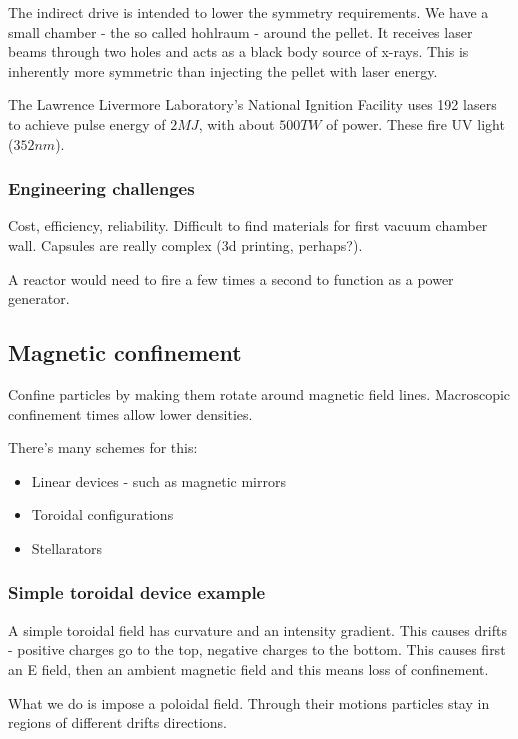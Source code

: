 \documentclass[PlasmaNotes.tex]{subfiles}
\begin{document}
The indirect drive is intended to lower the symmetry requirements. We have a small chamber - the so called hohlraum - around the pellet. It receives laser beams through two holes and acts as a black body source of x-rays. This is inherently more symmetric than injecting the pellet with laser energy.

The Lawrence Livermore Laboratory's National Ignition Facility uses 192 lasers to achieve pulse energy of $2 MJ$, with about $500 TW$ of power. These fire UV light ($352 nm$).

\subsubsection{Engineering challenges}

Cost, efficiency, reliability. Difficult to find materials for first vacuum chamber wall. Capsules are really complex (3d printing, perhaps?).

A reactor would need to fire a few times a second to function as a power generator.

\subsection{Magnetic confinement}

Confine particles by making them rotate around magnetic field lines. Macroscopic confinement times allow lower densities.

There's many schemes for this:
\begin{itemize}
 \item Linear devices - such as magnetic mirrors
 \item Toroidal configurations
 \item Stellarators
\end{itemize}

\subsubsection{Simple toroidal device example}

A simple toroidal field has curvature and an intensity gradient. This causes drifts - positive charges go to the top, negative charges to the bottom. This causes first an E field, then an ambient magnetic field and this means loss of confinement.

What we do is impose a poloidal field. Through their motions particles stay in regions of different drifts directions.
\end{document}
